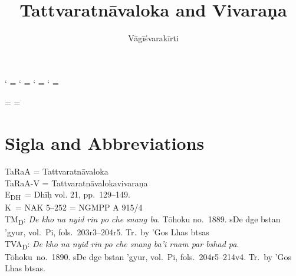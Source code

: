 \documentclass[12pt]{article}
\title{Tattvaratnāvaloka and Vivaraṇa}
\author{Vāgīśvarakīrti}
\begin{document}
\maketitle

\makeatletter
\newXeTeXintercharclass\noextraclass
\XeTeXcharclass `\? = \noextraclass
\XeTeXcharclass `\! = \noextraclass
\XeTeXcharclass `\; = \noextraclass
\XeTeXcharclass `\: = \noextraclass

\AddOpEmph{|}
\AddOpEmph{/}

 \noextraclass = {\nobreak}
\XeTeXinterchartoks {} = {\nobreak}
\makeatother

\newcommand{\PCreading}{$^{pc}$}
\newcommand{\ACreading}{$^{ac}$}
\newcommand{\MS}{K}
\newcommand{\EDD}{E\textsubscript{DH}}
\newcommand{\TM}{TM\textsubscript{D}}
\newcommand{\TVA}{TVA\textsubscript{D}}
\newcommand{\TVB}{TVB\textsubscript{N}}
\newcommand{\TIB}{TIB}
\newcommand{\sigmareading}[1]{$\Sigma$\textsubscript{#1}}

\newcommand{\emd} {\emph{em.}}
\newcommand{\conj} {\emph{conj.}}
\newcommand{\possibleconj} {\emph{possible conj.}}
\newcommand{\corr} {\emph{corr.}}
\newcommand{\diag} {\emph{diag.\ conj.}}
\newcommand{\possibleemd} {\emph{possible em.}}

\section{Sigla and Abbreviations}
\noindent TaRaA = Tattvaratnāvaloka\\

\noindent TaRaA-V = Tattvaratnāvalokavivaraṇa\\

\noindent \EDD\ = Dhīḥ vol. 21, pp.\ 129–149.\\

\noindent \MS\ = NAK 5–252 = NGMPP A 915/4\\

\noindent \TM : \emph{De kho na nyid rin po che snang ba}. Tōhoku no.\ 1889. sDe dge bstan 'gyur, vol.\ Pi, fols.\ 203r3–204r5. Tr.\ by 'Gos Lhas btsas\\

\noindent \TVA : \emph{De kho na nyid rin po che snang ba'i rnam par bshad pa}.  Tōhoku\ no.\ 1890.  sDe dge bstan 'gyur, vol.\ Pi, fols.\ 204r5–214v4. Tr.\ by 'Gos Lhas btsas.\\
\end{document}
